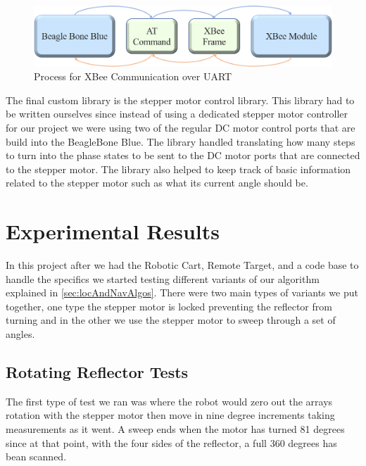 \begin{figure}[H]
  \centering
  \includegraphics[width=\textwidth]{figs/img/Command Process Diagram.png}
  \caption{Process for XBee Communication over UART}
  \label{fig:CommandProcessDiagram}
\end{figure}

\vspace*{12pt}
\noindent
The final custom library is the stepper motor control library. This library had to be written ourselves since instead of using a dedicated stepper motor controller for our project we were using two of the regular DC motor control ports that are build into the BeagleBone Blue. The library handled translating how many steps to turn into the phase states to be sent to the DC motor ports that are connected to the stepper motor. The library also helped to keep track of basic information related to the stepper motor such as what its current angle should be.

\section{Experimental Results}
\label{sec:Experimental Results}

In this project after we had the Robotic Cart, Remote Target, and a code base to handle the specifics we started testing different variants of our algorithm explained in \autoref{sec:locAndNavAlgos}. There were two main types of variants we put together, one type the stepper motor is locked preventing the reflector from turning and in the other we use the stepper motor to sweep through a set of angles.

\subsection{Rotating Reflector Tests}

The first type of test we ran was where the robot would zero out the arrays rotation with the stepper motor then move in nine degree increments taking measurements as it went. A sweep ends when the motor has turned 81 degrees since at that point, with the four sides of the reflector, a full 360 degrees has bean scanned.

